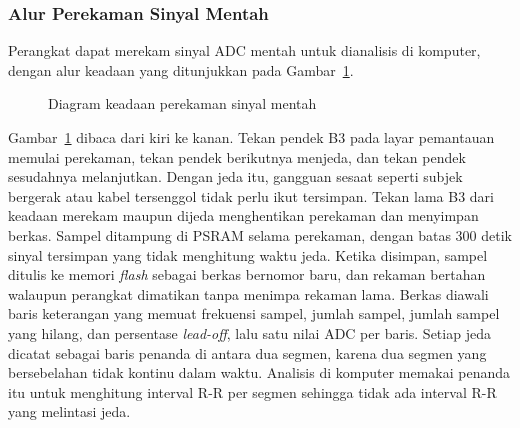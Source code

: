 \subsubsection{Alur Perekaman Sinyal Mentah}

Perangkat dapat merekam sinyal ADC mentah untuk dianalisis di komputer, dengan alur keadaan yang ditunjukkan pada Gambar~\ref{fig:3-alur-rekam}.

\begin{figure}[!ht]
  \centering
  \caption{Diagram keadaan perekaman sinyal mentah}
  \label{fig:3-alur-rekam}
\end{figure}

Gambar~\ref{fig:3-alur-rekam} dibaca dari kiri ke kanan. Tekan pendek B3 pada layar pemantauan memulai perekaman, tekan pendek berikutnya menjeda, dan tekan pendek sesudahnya melanjutkan. Dengan jeda itu, gangguan sesaat seperti subjek bergerak atau kabel tersenggol tidak perlu ikut tersimpan. Tekan lama B3 dari keadaan merekam maupun dijeda menghentikan perekaman dan menyimpan berkas. Sampel ditampung di PSRAM selama perekaman, dengan batas 300 detik sinyal tersimpan yang tidak menghitung waktu jeda. Ketika disimpan, sampel ditulis ke memori \textit{flash} sebagai berkas bernomor baru, dan rekaman bertahan walaupun perangkat dimatikan tanpa menimpa rekaman lama. Berkas diawali baris keterangan yang memuat frekuensi sampel, jumlah sampel, jumlah sampel yang hilang, dan persentase \textit{lead-off}, lalu satu nilai ADC per baris. Setiap jeda dicatat sebagai baris penanda di antara dua segmen, karena dua segmen yang bersebelahan tidak kontinu dalam waktu. Analisis di komputer memakai penanda itu untuk menghitung interval R-R per segmen sehingga tidak ada interval R-R yang melintasi jeda.

